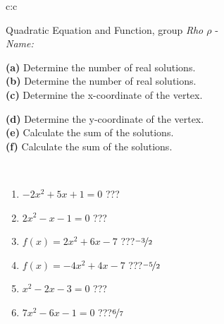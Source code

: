 \documentclass[10pt]{report}
\begin{document}
\begin{tabular}{c:c}
\begin{minipage}[c][104.5mm][t]{0.5\linewidth}
\begin{center}
\vspace{7mm}
{\huge {\LARGE Quadratic Equation and Function}, group \textit{Rho $\rho$} -}\\[5mm]
\textit{Name:}\phantom{xxxxxxxxxxxxxxxxxxxxxxxxxxxxxxxxxxxxxxxxxxxxxxxxxxxxxxxxxxxxxxxxx}\\[5mm]
\begin{minipage}{0.95\linewidth}
\begin{center}
{\small \begin{minipage}{0.5\textwidth}
\textbf{(a)} Determine the number of real solutions. \\[1mm]
\textbf{(b)} Determine the number of real solutions. \\[1mm]
\textbf{(c)} Determine the x-coordinate of the vertex.
\end{minipage} \begin{minipage}{0.49\textwidth}
\textbf{(d)} Determine the y-coordinate of the vertex. \\[1mm]
\textbf{(e)} Calculate the sum of the solutions. \\[1mm]
\textbf{(f)} Calculate the sum of the solutions.
\end{minipage}
}
\end{center}
\end{minipage}
\\[4mm]
\begin{minipage}{0.79\linewidth}
\begin{center}
\begin{varwidth}{\linewidth}
\begin{enumerate}
\Large
\item $-2x^2+5x+1=0$\quad \dotfill\; ???\;\dotfill {}
\item $2x^2-x-1=0$\quad \dotfill\; ???\;\dotfill {}
\item $f(x)=2x^2+6x-7$\quad \dotfill\; ???\;\dotfill \quad $\nicefrac{-3}{2}$
\item $f(x)=-4x^2+4x-7$\quad \dotfill\; ???\;\dotfill \quad $\nicefrac{-5}{2}$
\item $x^2-2x-3=0$\quad \dotfill\; ???\;\dotfill {}
\item $7x^2-6x-1=0$\quad \dotfill\; ???\;\dotfill \quad $\nicefrac{6}{7}$
\end{enumerate}
\end{varwidth}

\end{center}
\end{minipage}
\end{center}
\end{minipage}
\end{tabular}
\end{document}
